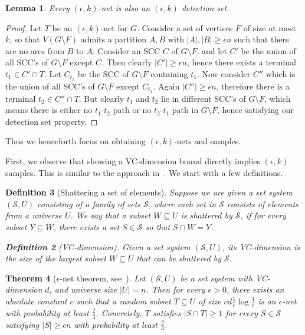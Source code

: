 \documentclass[11pt]{article}
\newtheorem{theorem}{Theorem}[section]
\newtheorem{lemma}[theorem]{Lemma}
\newtheorem{definition}[theorem]{Definition}
\renewcommand{\SS}{\mathcal{S}}
\begin{document}
\begin{lemma}
Every $(\epsilon, k)$-net is also an $(\epsilon,k)$ detection set.

\end{lemma}

\begin{proof}
Let $T$ be an $(\epsilon,k)$-net for $G$.
    Consider a set of vertices $F$ of size at most $k$, so that $V(G \setminus F)$ admits a partition  $A,B$ with $|A|,|B| \geq \epsilon n$ such that there are no arcs from $B$ to $A$. Consider an SCC $C$ of $G \setminus F$, and let $C'$ be the union of all SCC's of $G \setminus F$ except $C$. Then clearly $|C'| \geq \epsilon n$, hence there exists a terminal $t_1 \in C' \cap T$. Let $C_{t_1}$ be the SCC of $G \setminus F$ containing $t_1$. Now consider $C''$ which is the union of all SCC's of $G \setminus F$ except $C_{t_1}$. Again $|C''| \geq \epsilon n$, therefore there is a terminal $t_2 \in  C'' \cap T$. But clearly $t_1$ and $t_2$ lie in different SCC's of $G \setminus F$, which means there is either no $t_1$-$t_2$ path or no $t_2$-$t_1$ path in $G \setminus F$, hence satisfying our detection set property.
\end{proof}



Thus we henceforth focus on obtaining $(\epsilon,k)$-nets and samples.




First, we observe that showing a VC-dimension bound directly implies $(\epsilon,k)$ samples. This is similar to the approach in~\cite{fm06}. We start with a few definitions.

\begin{definition}[Shattering a set of elements] Suppose we are given a set system $(\SS, U)$ consisting of a family of sets $\SS$, where each set in $\SS$ consists of elements from a universe $U$. We say that a subset $W \subseteq U$ is \emph{shattered} by $\SS$, if for every subset $Y \subseteq W$, there exists a set $S \in \SS$ so that $S \cap W = Y$.

\begin{definition}[VC-dimension]
Given a set system $(\SS, U)$, its VC-dimension is the size of the largest subset $W \subseteq U$ that can be shattered by $\SS$.    
\end{definition}



\end{definition}


\begin{theorem}[$\epsilon$-net theorem, see~\cite{fm06}]\label{thm:eps_net}
Let $(\SS, U)$ be a set system with VC-dimension $d$, and universe size $|U| = n$. Then for every $\epsilon > 0$, there exists an absolute constant $c$ such that a random subset $T \subseteq U$ of size $c{d}\frac{1}{\epsilon} \log \frac{1}{\epsilon}$ is  an $\epsilon$-net with probability at least $\frac{2}{3}$.
Concretely, $T$ satisfies $|S \cap T| \geq 1$ for every $S \in \SS$ satisfying $|S| \geq \epsilon n$ with probability at least $\frac{2}{3}$.
\end{theorem}
\end{document}
